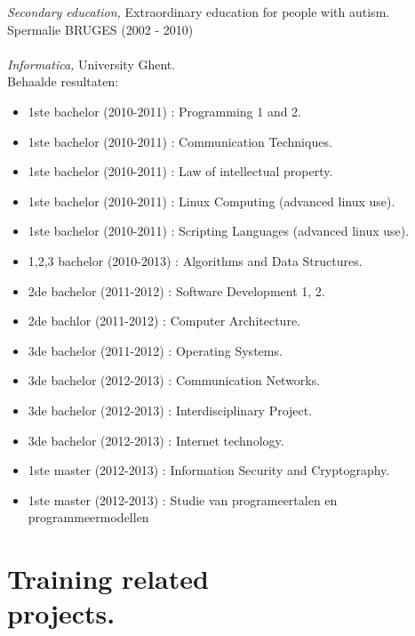 \documentclass[margin, 10pt]{res} %
\begin{document}
\begin{resume}
{\sl Secondary education,} Extraordinary education for people with autism.\\
Spermalie BRUGES (2002 - 2010)
\\ \\
{\sl Informatica,} University Ghent.\\
Behaalde resultaten:

\begin{itemize}
\item{1ste bachelor  (2010-2011) : Programming 1 and 2.}
\item{1ste bachelor  (2010-2011) : Communication Techniques.}
\item{1ste bachelor  (2010-2011) : Law of intellectual property.}
\item{1ste bachelor  (2010-2011) : Linux Computing (advanced linux use).}
\item{1ste bachelor  (2010-2011) : Scripting Languages (advanced linux use).}
\item{1,2,3 bachelor (2010-2013) : Algorithms and Data Structures.}
\item{2de bachelor   (2011-2012) : Software Development 1, 2.}
\item{2de bachlor    (2011-2012) : Computer Architecture.}
\item{3de bachelor   (2011-2012) : Operating Systems.}
\item{3de bachelor   (2012-2013) : Communication Networks.}
\item{3de bachelor   (2012-2013) : Interdisciplinary Project.}
\item{3de bachelor   (2012-2013) : Internet technology.}
\item{1ste master    (2012-2013) : Information Security and Cryptography.}
\item{1ste master    (2012-2013) : Studie van programeertalen en programmeermodellen}
\end{itemize}
 

\section{Training related \\ projects.} 


\end{resume}
\end{document}
